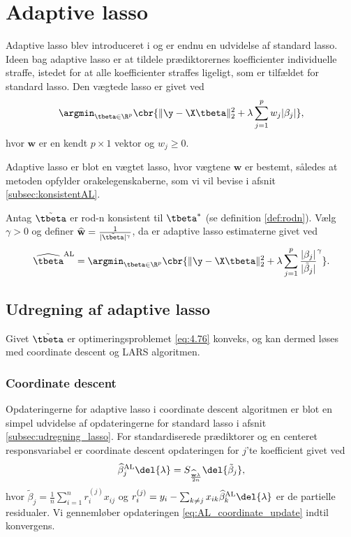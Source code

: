 \section{Adaptive lasso}
Adaptive lasso blev introduceret i \citep{adaptive_lasso} og er endnu en udvidelse af standard lasso.
Ideen bag adaptive lasso er at tildele prædiktorernes koefficienter individuelle straffe, istedet for at alle koefficienter straffes ligeligt, som er tilfældet for standard lasso.
Den vægtede lasso er givet ved
\begin{align*}
\argmin_{\tbeta \in \R^p} \cbr{\Vert \y - \X \tbeta \Vert_2^2 + \lambda \sum_{j=1}^p w_j \vert \beta_j \vert},
\end{align*}
hvor \(\mathbf{w}\) er en kendt \(p \times 1\) vektor og \(w_j \geq 0\).

Adaptive lasso er blot en vægtet lasso, hvor vægtene \(\mathbf{w}\) er bestemt, således at metoden opfylder orakelegenskaberne, som vi vil bevise i afsnit \ref{subsec:konsistentAL}.
\begin{defn}
Antag \(\tilde{\tbeta}\) er rod-n konsistent til \(\tbeta^*\) (se definition \ref{def:rodn}).
Vælg \(\gamma>0\) og definer \(\widehat{\mathbf{w}} = \frac{1}{\vert \tilde{\tbeta} \vert^\gamma}\), da er adaptive lasso estimaterne givet ved
\begin{align}
\widehat{\tbeta}^\text{AL} = \argmin_{\tbeta \in \R^p} \cbr{ \Vert \y - \X \tbeta \Vert_2^2 + \lambda \sum_{j=1}^p \frac{ \vert \beta_j \vert}{\vert \tilde{\beta}_j \vert }^\gamma}. \label{eq:4.76}
\end{align}
\end{defn}

\subsection{Udregning af adaptive lasso}
Givet \(\tilde{\tbeta}\) er optimeringsproblemet \eqref{eq:4.76} konveks, og kan dermed løses med coordinate descent og LARS algoritmen.
\subsubsection{Coordinate descent}
Opdateringerne for adaptive lasso i coordinate descent algoritmen er blot en simpel udvidelse af opdateringerne for standard lasso i afsnit \ref{subsec:udregning_lasso}.
For standardiserede prædiktorer og en centeret responsvariabel er coordinate descent opdateringen for $j$'te koefficient givet ved
\begin{align}
\widehat{\beta}^\text{AL}_j \del{\lambda}= S_{\frac{\widehat{\mathbf{w}} \lambda}{2n}} \del{\tilde{\beta}_j}, \label{eq:AL_coordinate_update}
\end{align}
hvor \(\tilde{\beta}_j = \frac{1}{n} \sum_{i=1}^n r_{i}^{(j)} x_{ij}\) og \(r_{i}^{(j)} = y_i - \sum_{k \neq j} x_{ik} \widehat{\beta}^\text{AL}_k \del{\lambda}\) er de partielle residualer.
Vi gennemløber opdateringen \eqref{eq:AL_coordinate_update} indtil konvergens.

